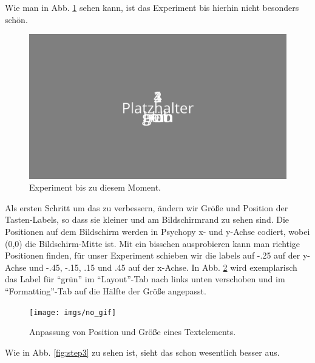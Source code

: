 \documentclass[
]{book}
\begin{document}
Wie man in Abb. \ref{fig:step1} sehen kann, ist das Experiment bis hierhin nicht besonders schön.



\begin{figure}

{\centering \includegraphics[width=.8\textwidth]{imgs/step1} 

}

\caption{Experiment bis zu diesem Moment.}\label{fig:step1}
\end{figure}

Als ersten Schritt um das zu verbessern, ändern wir Größe und Position der Tasten-Labels, so dass sie kleiner und am Bildschirmrand zu sehen sind. Die Positionen auf dem Bildschirm werden in Psychopy x- und y-Achse codiert, wobei (0,0) die Bildschirm-Mitte ist. Mit ein bisschen ausprobieren kann man richtige Positionen finden, für unser Experiment schieben wir die labels auf -.25 auf der y-Achse und -.45, -.15, .15 und .45 auf der x-Achse.
In Abb. \ref{fig:step2} wird exemplarisch das Label für ``grün'' im ``Layout''-Tab nach links unten verschoben und im ``Formatting''-Tab auf die Hälfte der Größe angepasst.



\begin{figure}

{\centering \texttt{[image: imgs/no\_gif]} 

}

\caption{Anpassung von Position und Größe eines Textelements.}\label{fig:step2}
\end{figure}

Wie in Abb. \ref{fig:step3} zu sehen ist, sieht das schon wesentlich besser aus.
\end{document}
